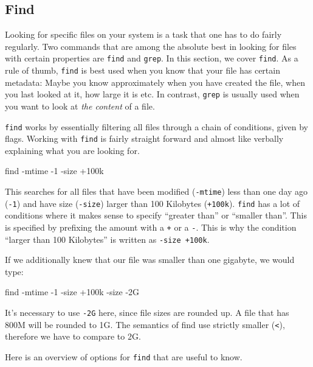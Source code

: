 \documentclass{TheAlternativeCourse}
\begin{document}
\subsection{Find}

Looking for specific files on your system is a task that one has to do fairly
regularly. Two commands that are among the absolute best in looking for files
with certain properties are \texttt{find} and \texttt{grep}. In this section,
we cover \texttt{find}.  As a rule of thumb, \texttt{find} is best used when
you know that your file has certain metadata: Maybe you know approximately when
you have created the file, when you last looked at it, how large it is etc. In
contrast, \texttt{grep} is usually used when you want to look at \emph{the
content} of a file.

\texttt{find} works by essentially filtering all files through a chain of
conditions, given by flags. Working with \texttt{find} is
fairly straight forward and almost like verbally explaining what you are
looking for.

\begin{cmdbox}
find -mtime -1 -size +100k
\end{cmdbox}

This searches for all files that have been modified (\texttt{-mtime}) less than
one day ago (\texttt{-1}) and have size (\texttt{-size}) larger than 100
Kilobytes (\texttt{+100k}). \texttt{find} has a lot of conditions where it
makes sense to specify ``greater than'' or ``smaller than''. This is specified
by prefixing the amount with a \texttt{+} or a \texttt{-}. This is why the
condition ``larger than 100 Kilobytes'' is written as \texttt{-size +100k}.

If we additionally knew that our file was smaller than one gigabyte, we would
type:
\begin{cmdbox}
find -mtime -1 -size +100k -size -2G
\end{cmdbox}

It's necessary to use \texttt{-2G} here, since file sizes are rounded up.
A file that has 800M will be rounded to 1G. The semantics of find use strictly
smaller (\texttt{<}), therefore we have to compare to 2G.

Here is an overview of options for \texttt{find} that are useful to know.
\end{document}
